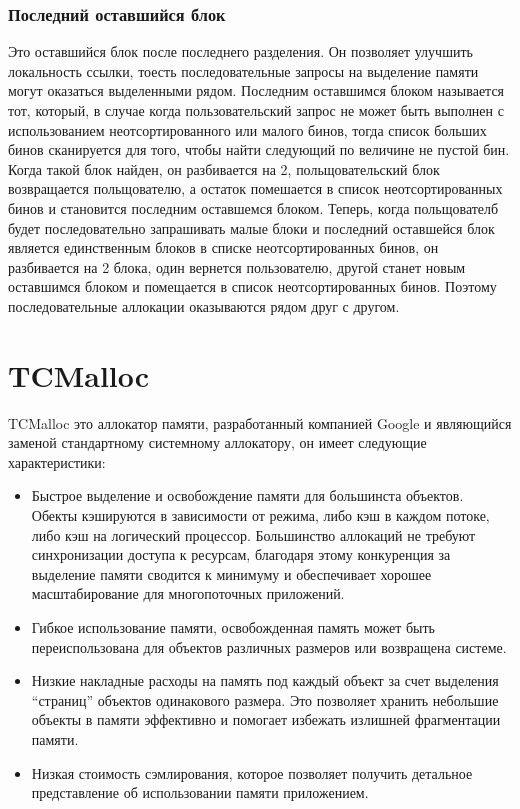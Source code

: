 \subsubsection{Последний оставшийся блок}
Это оставшийся блок после последнего разделения. Он позволяет улучшить локальность ссылки, тоесть последовательные запросы на выделение памяти могут оказаться выделенными рядом. Последним оставшимся блоком называется тот, который, в случае когда пользовательский запрос не может быть выполнен с использованием неотсортированного или малого бинов, тогда список больших бинов сканируется для того, чтобы найти следующий по величине не пустой бин. Когда такой блок найден, он разбивается на 2, польщовательский блок возвращается польщователю, а остаток помешается в список неотсортированных бинов и становится последним оставшемся блоком. Теперь, когда польщователб будет последовательно запрашивать малые блоки и последний оставшейся блок является единственным блоков в списке неотсортированных бинов, он разбивается на 2 блока, один вернется пользователю, другой станет новым оставшимся блоком и помещается в список неотсортированных бинов. Поэтому последовательные аллокации оказываются рядом друг с другом.

\section{TCMalloc}
TCMalloc это аллокатор памяти, разработанный компанией Google и являющийся заменой стандартному системному аллокатору, он имеет следующие характеристики:
\begin{itemize}
	\item Быстрое выделение и освобождение памяти для большинста объектов. Обекты кэшируются в зависимости от режима, либо кэш в каждом потоке, либо кэш на логический процессор. Большинство аллокаций не требуют синхронизации доступа к ресурсам, благодаря этому конкуренция за выделение памяти сводится к минимуму и обеспечивает хорошее масштабирование для многопоточных приложений.
	\item Гибкое использование памяти, освобожденная память может быть переиспользована для объектов различных размеров или возвращена системе.
	\item Низкие накладные расходы на память под каждый объект за счет выделения ``страниц'' объектов одинакового размера. Это позволяет хранить небольшие объекты в памяти эффективно и помогает избежать излишней фрагментации памяти.
	\item Низкая стоимость сэмлирования, которое позволяет получить детальное представление об использовании памяти приложением.
\end{itemize}

